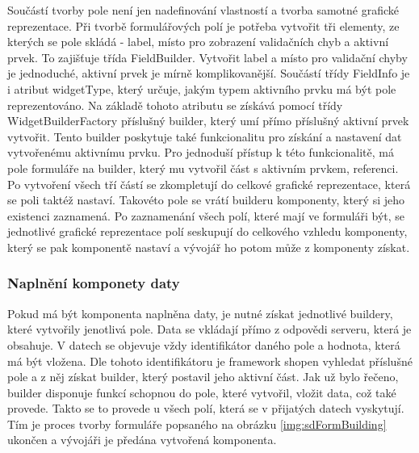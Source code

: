 Součástí tvorby pole není jen nadefinování vlastností a tvorba samotné grafické reprezentace. Při tvorbě formulářových polí je potřeba vytvořit tři elementy, ze kterých se pole skládá - label, místo pro zobrazení validačních chyb a aktivní prvek. To zajišťuje třída FieldBuilder. Vytvořit label a místo pro validační chyby je jednoduché, aktivní prvek je mírně komplikovanější. Součástí třídy FieldInfo je i atribut widgetType, který určuje, jakým typem aktivního prvku má být pole reprezentováno. Na základě tohoto atributu se získává pomocí třídy WidgetBuilderFactory příslušný builder, který umí přímo příslušný aktivní prvek vytvořit. Tento builder poskytuje také funkcionalitu pro získání a nastavení dat vytvořenému aktivnímu prvku. Pro jednoduší přístup k této funkcionalitě, má pole formuláře na builder, který mu vytvořil část s aktivním prvkem, referenci. Po vytvoření všech tří částí se zkompletují do celkové grafické reprezentace, která se poli taktéž nastaví. Takovéto pole se vrátí builderu komponenty, který si jeho existenci zaznamená. Po zaznamenání všech polí, které mají ve formuláři být, se jednotlivé grafické reprezentace polí seskupují do celkového vzhledu komponenty, který se pak komponentě nastaví a vývojář ho potom může z komponenty získat.

\subsubsection{Naplnění komponety daty}
Pokud má být komponenta naplněna daty, je nutné získat jednotlivé buildery, které vytvořily jenotlivá pole. Data se vkládají přímo z odpovědi serveru, která je obsahuje. V datech se objevuje vždy identifikátor daného pole a hodnota, která má být vložena. Dle tohoto identifikátoru je framework shopen vyhledat příslušné pole a z něj získat builder, který postavil jeho aktivní část. Jak už bylo řečeno, builder disponuje funkcí schopnou do pole, které vytvořil, vložit data, což také provede. Takto se to provede u všech polí, která se v přijatých datech vyskytují. Tím je proces tvorby formuláře popsaného na obrázku \ref{img:sdFormBuilding} ukončen a vývojáři je předána vytvořená komponenta. 

